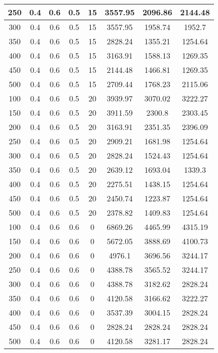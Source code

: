 \documentclass[a4paper, 12pt]{extreport}
\begin{document}
\begin{itemize}
\begin{longtable}{|c|c|c|c|c|c|c|c|}
			250 & 0.4 & 0.6 & 0.5 & 15 & 3557.95 & 2096.86 & 2144.48 \\\hline
			300 & 0.4 & 0.6 & 0.5 & 15 & 3557.95 & 1958.74 & 1952.7 \\\hline
			350 & 0.4 & 0.6 & 0.5 & 15 & 2828.24 & 1355.21 & 1254.64 \\\hline
			400 & 0.4 & 0.6 & 0.5 & 15 & 3163.91 & 1588.13 & 1269.35 \\\hline
			450 & 0.4 & 0.6 & 0.5 & 15 & 2144.48 & 1466.81 & 1269.35 \\\hline
			500 & 0.4 & 0.6 & 0.5 & 15 & 2709.44 & 1768.23 & 2115.06 \\\hline
			100 & 0.4 & 0.6 & 0.5 & 20 & 3939.97 & 3070.02 & 3222.27 \\\hline
			150 & 0.4 & 0.6 & 0.5 & 20 & 3911.59 & 2300.8 & 2303.45 \\\hline
			200 & 0.4 & 0.6 & 0.5 & 20 & 3163.91 & 2351.35 & 2396.09 \\\hline
			250 & 0.4 & 0.6 & 0.5 & 20 & 2909.21 & 1681.98 & 1254.64 \\\hline
			300 & 0.4 & 0.6 & 0.5 & 20 & 2828.24 & 1524.43 & 1254.64 \\\hline
			350 & 0.4 & 0.6 & 0.5 & 20 & 2639.12 & 1693.04 & 1339.3 \\\hline
			400 & 0.4 & 0.6 & 0.5 & 20 & 2275.51 & 1438.15 & 1254.64 \\\hline
			450 & 0.4 & 0.6 & 0.5 & 20 & 2450.74 & 1223.87 & 1254.64 \\\hline
			500 & 0.4 & 0.6 & 0.5 & 20 & 2378.82 & 1409.83 & 1254.64 \\\hline
			100 & 0.4 & 0.6 & 0.6 & 0 & 6869.26 & 4465.99 & 4315.19 \\\hline
			150 & 0.4 & 0.6 & 0.6 & 0 & 5672.05 & 3888.69 & 4100.73 \\\hline
			200 & 0.4 & 0.6 & 0.6 & 0 & 4976.1 & 3696.56 & 3244.17 \\\hline
			250 & 0.4 & 0.6 & 0.6 & 0 & 4388.78 & 3565.52 & 3244.17 \\\hline
			300 & 0.4 & 0.6 & 0.6 & 0 & 4388.78 & 3182.62 & 2828.24 \\\hline
			350 & 0.4 & 0.6 & 0.6 & 0 & 4120.58 & 3166.62 & 3222.27 \\\hline
			400 & 0.4 & 0.6 & 0.6 & 0 & 3537.39 & 3004.15 & 2828.24 \\\hline
			450 & 0.4 & 0.6 & 0.6 & 0 & 2828.24 & 2828.24 & 2828.24 \\\hline
			500 & 0.4 & 0.6 & 0.6 & 0 & 4120.58 & 3281.17 & 2828.24 \\\hline

\end{longtable}
\end{itemize}
\end{document}
